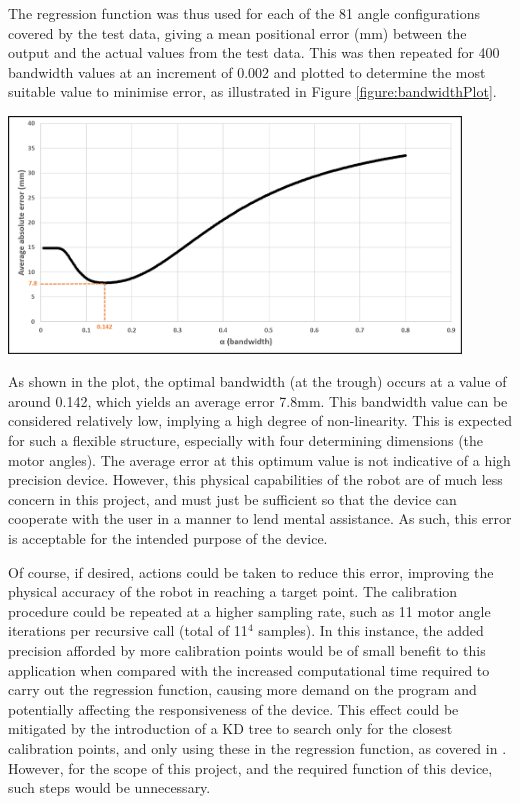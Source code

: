\documentclass[11pt]{article}
\begin{document}
The regression function was thus used for each of the 81 angle configurations covered by the test data, giving a mean positional error (mm) between the output and the actual values from the test data. This was then repeated for 400 bandwidth values at an increment of 0.002 and plotted to determine the most suitable value to minimise error, as illustrated in Figure \ref{figure:bandwidthPlot}.


\begin{center}
\includegraphics[width=0.9\textwidth]{images/newBandwidth.png}
\label{figure:bandwidthPlot}
\end{center}


As shown in the plot, the optimal bandwidth (at the trough) occurs at a value of around 0.142, which yields an average error 7.8mm. This bandwidth value can be considered relatively low, implying a high degree of non-linearity. This is expected for such a flexible structure, especially with four determining dimensions (the motor angles). The average error at this optimum value is not indicative of a high precision device. However, this physical capabilities of the robot are of much less concern in this project, and must just be sufficient so that the device can cooperate with the user in a manner to lend mental assistance. As such, this error is acceptable for the intended purpose of the device. 

Of course, if desired, actions could be taken to reduce this error, improving the physical accuracy of the robot in reaching a target point. The calibration procedure could be repeated at a higher sampling rate, such as 11 motor angle iterations per recursive call (total of 11$^4$ samples).  In this instance, the added precision afforded by more calibration points would be of small benefit to this application when compared with the increased computational time required to carry out the regression function, causing more demand on the program and potentially affecting the responsiveness of the device. This effect could be mitigated by the introduction of a KD tree to search only for the closest calibration points, and only using these in the regression function, as covered in \cite{GreggSmithPhd}. However, for the scope of this project, and the required function of this device, such steps would be unnecessary.
\end{document}
